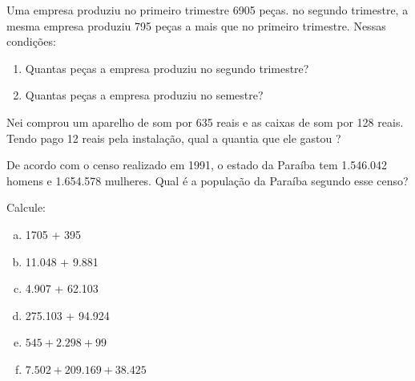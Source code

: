 \item Uma empresa produziu no primeiro trimestre 6905 peças. no segundo trimestre, a mesma empresa produziu 795 peças a mais que no primeiro trimestre. Nessas condições:
\begin{enumerate}
	\item Quantas peças a empresa produziu no segundo trimestre?
	\item Quantas peças a empresa produziu no semestre?
\end{enumerate}

\item Nei comprou um aparelho de som por 635 reais e as caixas de som por 128 reais. Tendo pago 12 reais pela instalação, qual a quantia que ele gastou ?

\item De acordo com o censo realizado em 1991, o estado da Paraíba tem 1.546.042 homens e 1.654.578 mulheres. Qual é a população da Paraíba segundo esse censo?

\item Calcule:

\begin{multicols}{3}
\begin{enumerate}[a)]
	\item 1705 + 395 
	\item 11.048 + 9.881 
	\item 4.907 + 62.103 
	\item 275.103 + 94.924 
	\item $545 + 2.298 + 99$
	\item $7.502 + 209.169 + 38.425$
\end{enumerate}
\end{multicols}



